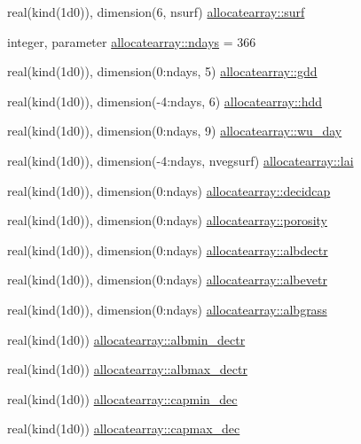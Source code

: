 \begin{DoxyCompactItemize}
\item 
real(kind(1d0)), dimension(6, nsurf) \hyperlink{namespaceallocatearray_a25ebdf393dee2419f983b4ac7d2bf2e9}{allocatearray\+::surf}
\item 
integer, parameter \hyperlink{namespaceallocatearray_ad1f75258d3afd41ea7c941d35561665b}{allocatearray\+::ndays} = 366
\item 
real(kind(1d0)), dimension(0\+:ndays, 5) \hyperlink{namespaceallocatearray_a75b46c8914271b763866d92533f09b19}{allocatearray\+::gdd}
\item 
real(kind(1d0)), dimension(-\/4\+:ndays, 6) \hyperlink{namespaceallocatearray_aae45e57c1b2d211392c5f98300524ee8}{allocatearray\+::hdd}
\item 
real(kind(1d0)), dimension(0\+:ndays, 9) \hyperlink{namespaceallocatearray_a5a9854768fde92cc3ec838f8729f5d42}{allocatearray\+::wu\+\_\+day}
\item 
real(kind(1d0)), dimension(-\/4\+:ndays, nvegsurf) \hyperlink{namespaceallocatearray_ab660d7e4ca340b0b677a74ecb8bb34f4}{allocatearray\+::lai}
\item 
real(kind(1d0)), dimension(0\+:ndays) \hyperlink{namespaceallocatearray_a73c64b6d041d6c9bb27a54bd87fcb9b9}{allocatearray\+::decidcap}
\item 
real(kind(1d0)), dimension(0\+:ndays) \hyperlink{namespaceallocatearray_ad6779574483b9977e34962301653f997}{allocatearray\+::porosity}
\item 
real(kind(1d0)), dimension(0\+:ndays) \hyperlink{namespaceallocatearray_ac2b3eb71556f66b5cb4a91b0b0e8d6d3}{allocatearray\+::albdectr}
\item 
real(kind(1d0)), dimension(0\+:ndays) \hyperlink{namespaceallocatearray_a55c401506715656db25c4f3ea8d44956}{allocatearray\+::albevetr}
\item 
real(kind(1d0)), dimension(0\+:ndays) \hyperlink{namespaceallocatearray_af087b466573effc0552f0a3b2d367db3}{allocatearray\+::albgrass}
\item 
real(kind(1d0)) \hyperlink{namespaceallocatearray_ab492b6627f6d8d971ea232940929793e}{allocatearray\+::albmin\+\_\+dectr}
\item 
real(kind(1d0)) \hyperlink{namespaceallocatearray_ab001abfda12eff772a5f95a8c6ac08ec}{allocatearray\+::albmax\+\_\+dectr}
\item 
real(kind(1d0)) \hyperlink{namespaceallocatearray_a618a159ee64457fbf327e9bed8a0f942}{allocatearray\+::capmin\+\_\+dec}
\item 
real(kind(1d0)) \hyperlink{namespaceallocatearray_a9efd342ce550303baf767c606737959f}{allocatearray\+::capmax\+\_\+dec}

\end{DoxyCompactItemize}
